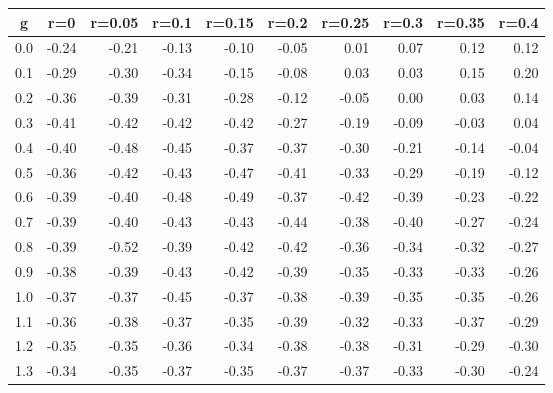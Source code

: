 %
\begin{table}[!tbp]
 \begin{center}
 \begin{tabular}{rrrrrrrrrr}\hline\hline
\multicolumn{1}{c}{g}&\multicolumn{1}{c}{r=0}&\multicolumn{1}{c}{r=0.05}&\multicolumn{1}{c}{r=0.1}&\multicolumn{1}{c}{r=0.15}&\multicolumn{1}{c}{r=0.2}&\multicolumn{1}{c}{r=0.25}&\multicolumn{1}{c}{r=0.3}&\multicolumn{1}{c}{r=0.35}&\multicolumn{1}{c}{r=0.4}\tabularnewline
\hline
0.0&-0.24&-0.21&-0.13&-0.10&-0.05& 0.01& 0.07& 0.12& 0.12\tabularnewline
0.1&-0.29&-0.30&-0.34&-0.15&-0.08& 0.03& 0.03& 0.15& 0.20\tabularnewline
0.2&-0.36&-0.39&-0.31&-0.28&-0.12&-0.05& 0.00& 0.03& 0.14\tabularnewline
0.3&-0.41&-0.42&-0.42&-0.42&-0.27&-0.19&-0.09&-0.03& 0.04\tabularnewline
0.4&-0.40&-0.48&-0.45&-0.37&-0.37&-0.30&-0.21&-0.14&-0.04\tabularnewline
0.5&-0.36&-0.42&-0.43&-0.47&-0.41&-0.33&-0.29&-0.19&-0.12\tabularnewline
0.6&-0.39&-0.40&-0.48&-0.49&-0.37&-0.42&-0.39&-0.23&-0.22\tabularnewline
0.7&-0.39&-0.40&-0.43&-0.43&-0.44&-0.38&-0.40&-0.27&-0.24\tabularnewline
0.8&-0.39&-0.52&-0.39&-0.42&-0.42&-0.36&-0.34&-0.32&-0.27\tabularnewline
0.9&-0.38&-0.39&-0.43&-0.42&-0.39&-0.35&-0.33&-0.33&-0.26\tabularnewline
1.0&-0.37&-0.37&-0.45&-0.37&-0.38&-0.39&-0.35&-0.35&-0.26\tabularnewline
1.1&-0.36&-0.38&-0.37&-0.35&-0.39&-0.32&-0.33&-0.37&-0.29\tabularnewline
1.2&-0.35&-0.35&-0.36&-0.34&-0.38&-0.38&-0.31&-0.29&-0.30\tabularnewline
1.3&-0.34&-0.35&-0.37&-0.35&-0.37&-0.37&-0.33&-0.30&-0.24\tabularnewline
\hline
\end{tabular}

\end{center}

\end{table}

